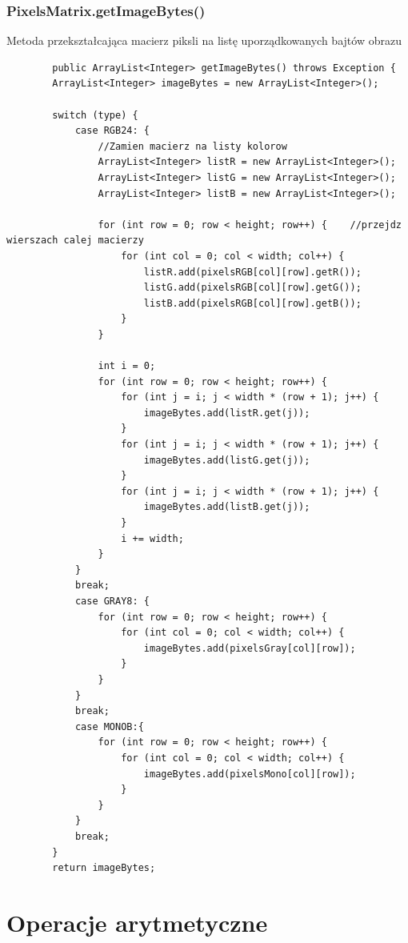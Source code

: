 \documentclass{article}
\begin{document}
	\subsubsection{PixelsMatrix.getImageBytes()}
	Metoda przekształcająca macierz piksli na listę uporządkowanych bajtów obrazu
	\begin{verbatim}
	    public ArrayList<Integer> getImageBytes() throws Exception {
        ArrayList<Integer> imageBytes = new ArrayList<Integer>();

        switch (type) {
            case RGB24: {
                //Zamien macierz na listy kolorow
                ArrayList<Integer> listR = new ArrayList<Integer>();
                ArrayList<Integer> listG = new ArrayList<Integer>();
                ArrayList<Integer> listB = new ArrayList<Integer>();

                for (int row = 0; row < height; row++) {    //przejdz wierszach calej macierzy
                    for (int col = 0; col < width; col++) {
                        listR.add(pixelsRGB[col][row].getR());
                        listG.add(pixelsRGB[col][row].getG());
                        listB.add(pixelsRGB[col][row].getB());
                    }
                }

                int i = 0;
                for (int row = 0; row < height; row++) {
                    for (int j = i; j < width * (row + 1); j++) {
                        imageBytes.add(listR.get(j));
                    }
                    for (int j = i; j < width * (row + 1); j++) {
                        imageBytes.add(listG.get(j));
                    }
                    for (int j = i; j < width * (row + 1); j++) {
                        imageBytes.add(listB.get(j));
                    }
                    i += width;
                }
            }
            break;
            case GRAY8: {
                for (int row = 0; row < height; row++) {
                    for (int col = 0; col < width; col++) {
                        imageBytes.add(pixelsGray[col][row]);
                    }
                }
            }
            break;
            case MONOB:{
                for (int row = 0; row < height; row++) {
                    for (int col = 0; col < width; col++) {
                        imageBytes.add(pixelsMono[col][row]);
                    }
                }
            }
            break;
        }
        return imageBytes;
	\end{verbatim}

\section{Operacje arytmetyczne}
\end{document}
